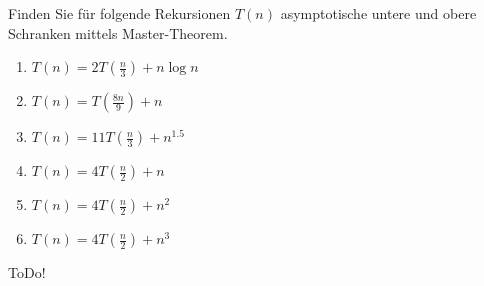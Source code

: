 
\begin{exercise}

Finden Sie für folgende Rekursionen $T(n)$ asymptotische untere und obere Schranken mittels Master-Theorem.

\begin{enumerate}[label = \alph*]
  \item $T(n) = 2T(\frac{n}{3}) + n \log n$
  \item $T(n) = T(\frac{8n}{9}) + n$
  \item $T(n) = 11T(\frac{n}{3}) + n^{1.5}$
  \item $T(n) = 4T(\frac{n}{2}) + n$
  \item $T(n) = 4T(\frac{n}{2}) + n^2$
  \item $T(n) = 4T(\frac{n}{2}) + n^3$
\end{enumerate}

\end{exercise}


\begin{solution}

ToDo!

\end{solution}


